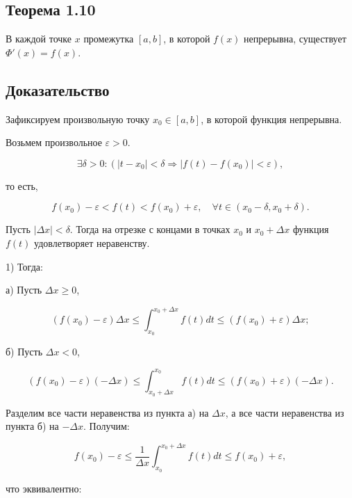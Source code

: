 {\subsection*{Теорема 1.10}

В каждой точке \( x \) промежутка \( [a, b] \), в которой \( f(x) \) непрерывна, существует \( \Phi'(x) = f(x) \).


\subsection*{Доказательство}

Зафиксируем произвольную точку \( x_0 \in [a, b] \), в которой функция непрерывна.

Возьмем произвольное \( \varepsilon > 0 \).



\[
\exists \delta > 0: (|t - x_0| < \delta \Rightarrow |f(t) - f(x_0)| < \varepsilon),
\]



то есть,



\[
f(x_0) - \varepsilon < f(t) < f(x_0) + \varepsilon, \quad \forall t \in (x_0 - \delta, x_0 + \delta).
\]



Пусть \( |\Delta x| < \delta \). Тогда на отрезке с концами в точках \( x_0 \) и \( x_0 + \Delta x \) функция \( f(t) \) удовлетворяет неравенству.

1) Тогда:

а) Пусть \( \Delta x \geq 0 \),



\[
(f(x_0) - \varepsilon) \Delta x \leq \int_{x_0}^{x_0+\Delta x} f(t) dt \leq (f(x_0) + \varepsilon) \Delta x;
\]



б) Пусть \( \Delta x < 0 \),



\[
(f(x_0) - \varepsilon)(- \Delta x) \leq \int_{x_0+\Delta x}^{x_0} f(t) dt \leq (f(x_0) + \varepsilon)(- \Delta x).
\]



Разделим все части неравенства из пункта а) на \( \Delta x \), а все части неравенства из пункта б) на \( - \Delta x \). Получим:



\[
f(x_0) - \varepsilon \leq \frac{1}{\Delta x} \int_{x_0}^{x_0+\Delta x} f(t) dt \leq f(x_0) + \varepsilon,
\]



что эквивалентно:



}

